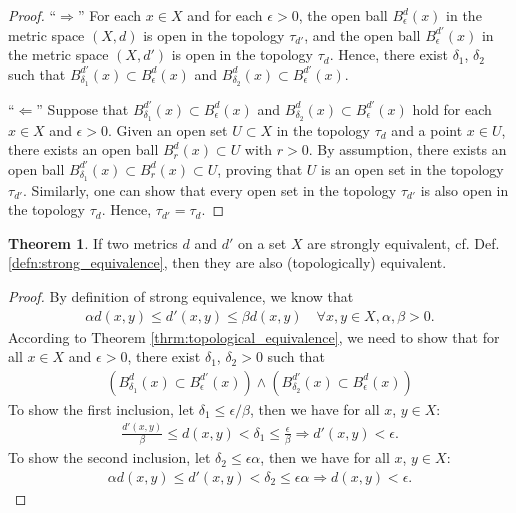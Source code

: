 \documentclass[12pt, a4paper]{article}
\numberwithin{equation}{section}
\theoremstyle{definition}
\theoremstyle{definition}
\newtheorem{theorem}[thm]{Theorem}
\begin{document}
	\begin{proof}
		\enquote{$\Longrightarrow$} For each $x\in X$ and for each $\epsilon > 0$, the open ball $B^{d}_{\epsilon}(x)$ in the metric space $(X, d)$ is open in the topology $\tau_{d'}$, and the open ball $B^{d'}_{\epsilon}(x)$ in the metric space $(X, d')$ is open in the topology $\tau_{d}$. Hence, there exist $\delta_1$, $\delta_2$ such that $B^{d'}_{\delta_1}(x) \subset B^{d}_{\epsilon}(x)$ and $B^{d}_{\delta_2}(x) \subset B^{d'}_{\epsilon}(x)$.
		
		\enquote{$\Longleftarrow$} Suppose that $B^{d'}_{\delta_1}(x) \subset B^{d}_{\epsilon}(x)$ and $B^{d}_{\delta_2}(x) \subset B^{d'}_{\epsilon}(x)$ hold for each $x\in X$ and $\epsilon > 0$. Given an open set $U\subset X$ in the topology $\tau_d$ and a point $x\in U$, there exists an open ball $B^{d}_{r}(x) \subset U$ with $r > 0$. By assumption, there exists an open ball $B^{d'}_{\delta_1}(x) \subset B^{d}_{r}(x) \subset U$, proving that $U$ is an open set in the topology $\tau_{d'}$. Similarly, one can show that every open set in the topology $\tau_{d'}$ is also open in the topology $\tau_{d}$. Hence, $\tau_{d'} = \tau_{d}$.
	\end{proof}

	\begin{theorem}
		If two metrics $d$ and $d'$ on a set $X$ are strongly equivalent, cf. Def. \ref{defn:strong_equivalence}, then they are also (topologically) equivalent.
	\end{theorem}

	\begin{proof}\cite{1379634}
		By definition of strong equivalence, we know that 
		\begin{align}
			\alpha d(x, y) \leq d'(x, y) \leq \beta d(x, y) \quad\forall x, y\in X, \alpha, \beta > 0.
		\end{align}
		According to Theorem \ref{thrm:topological_equivalence}, we need to show that for all $x\in X$ and $\epsilon > 0$, there exist $\delta_1$, $\delta_2 > 0$ such that 
		\begin{align}
			\left(B_{\delta_1}^{d}(x) \subset B_{\epsilon}^{d'}(x)\right) \wedge \left(B^{d'}_{\delta_2}(x) \subset B^{d}_{\epsilon}(x)\right)
		\end{align}
		To show the first inclusion, let $\delta_1 \leq \epsilon/\beta$, then we have for all $x$, $y\in X$:
		\begin{align}
			\frac{d'(x, y)}{\beta} \leq d(x, y) < \delta_1 \leq \frac{\epsilon}{\beta} \Rightarrow d'(x, y) < \epsilon.
		\end{align}
		To show the second inclusion, let $\delta_2 \leq \epsilon\alpha$, then we have for all $x$, $y\in X$:
		\begin{align}
			\alpha d(x, y)\leq d'(x, y) < \delta_2 \leq \epsilon\alpha \Rightarrow d(x, y) < \epsilon.
		\end{align}
	\end{proof}
\end{document}
